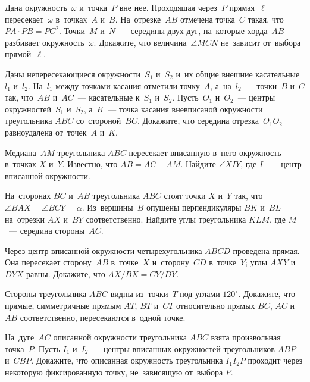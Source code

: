 


\begin{problems}

\item
Дана окружность~$\omega$ и~точка~$P$ вне нее.
Проходящая через~$P$ прямая~$\ell$ пересекает~$\omega$ в~точках~$A$ и~$B$.
На~отрезке~$AB$ отмечена точка~$C$ такая, что~$PA\cdot PB=PC^2$.
Точки~$M$ и~$N$~--- середины двух дуг, на~которые хорда~$AB$ разбивает
окружность~$\omega$.
Докажите, что величина~$\angle MCN$ не~зависит от~выбора прямой~$\ell$.

\item
Даны непересекающиеся окружности~$S_{1}$ и~$S_{2}$ и~их общие внешние
касательные~$l_{1}$ и~$l_{2}$.
На~$l_{1}$ между точками касания отметили точку~$A$, а~на~$l_{2}$~--- точки~$B$
и~$C$ так, что~$AB$ и~$AC$~--- касательные к~$S_{1}$ и~$S_{2}$.
Пусть~$O_{1}$ и~$O_{2}$~--- центры окружностей~$S_{1}$ и~$S_{2}$, а~$K$~---
точка касания вневписаной окружности треугольника $ABC$ со~стороной~$BC$.
Докажите, что середина отрезка~$O_{1}O_{2}$ равноудалена от~точек~$A$ и~$K$.

\item
Медиана~$AM$ треугольника $ABC$ пересекает вписанную в~него окружность
в~точках $X$ и~$Y$.
Известно, что $AB = AC + AM$.
Найдите $\angle XIY$, где $I$ ~--- центр вписанной окружности.

\item
На~сторонах $BC$ и~$AB$ треугольника $ABC$ стоят точки $X$ и~$Y$ так, что
$\angle BAX = \angle BCY = \alpha$.
Из~вершины~$B$ опущены перпендикуляры $BK$ и~$BL$ на~отрезки $AX$ и~$BY$
соответственно.
Найдите углы треугольника $KLM$, где $M$~--- середина стороны~$AC$.

\item
Через центр вписанной окружности четырехугольника $ABCD$ проведена прямая.
Она пересекает сторону~$AB$ в~точке~$X$ и~сторону~$CD$ в~точке~$Y$;
углы $AXY$ и~$DYX$ равны.
Докажите, что $AX / BX = CY / DY$.

\item
Стороны треугольника $ABC$ видны из~точки~$T$ под углами $120^\circ$.
Докажите, что прямые, симметричные прямым $AT$, $BT$ и~$CT$ относительно
прямых $BC$, $AC$ и~$AB$ соответственно, пересекаются в~одной точке.

\item
На~дуге~$AC$ описанной окружности треугольника $ABC$ взята произвольная
точка~$P$.
Пусть $I_{1}$ и~$I_{2}$~--- центры вписанных окружностей
треугольников $ABP$ и~$CBP$.
Докажите, что описанная окружность треугольника $I_{1}I_{2}P$ проходит через
некоторую фиксированную точку, не~зависящую от~выбора $P$.

\end{problems}

